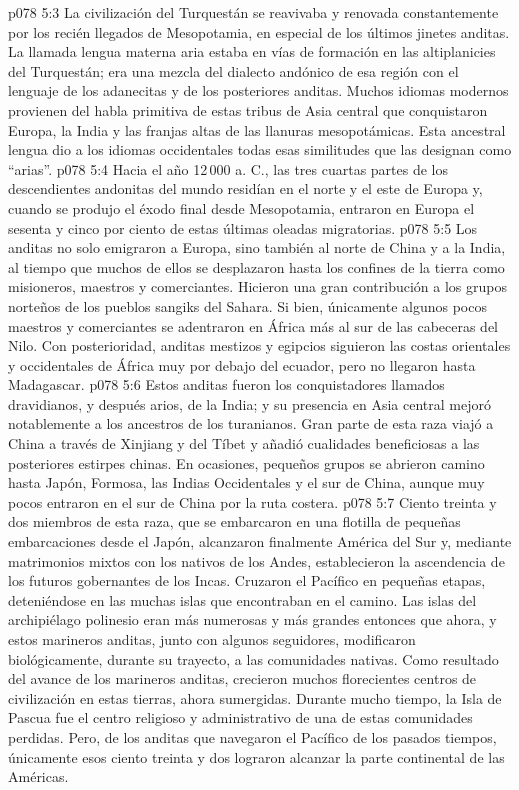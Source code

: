 \vs p078 5:3 La civilización del Turquestán se reavivaba y renovada constantemente por los recién llegados de Mesopotamia, en especial de los últimos jinetes anditas. La llamada lengua materna aria estaba en vías de formación en las altiplanicies del Turquestán; era una mezcla del dialecto andónico de esa región con el lenguaje de los adanecitas y de los posteriores anditas. Muchos idiomas modernos provienen del habla primitiva de estas tribus de Asia central que conquistaron Europa, la India y las franjas altas de las llanuras mesopotámicas. Esta ancestral lengua dio a los idiomas occidentales todas esas similitudes que las designan como “arias”.
\vs p078 5:4 \pc Hacia el año 12\,000 a. C., las tres cuartas partes de los descendientes andonitas del mundo residían en el norte y el este de Europa y, cuando se produjo el éxodo final desde Mesopotamia, entraron en Europa el sesenta y cinco por ciento de estas últimas oleadas migratorias.
\vs p078 5:5 \pc Los anditas no solo emigraron a Europa, sino también al norte de China y a la India, al tiempo que muchos de ellos se desplazaron hasta los confines de la tierra como misioneros, maestros y comerciantes. Hicieron una gran contribución a los grupos norteños de los pueblos sangiks del Sahara. Si bien, únicamente algunos pocos maestros y comerciantes se adentraron en África más al sur de las cabeceras del Nilo. Con posterioridad, anditas mestizos y egipcios siguieron las costas orientales y occidentales de África muy por debajo del ecuador, pero no llegaron hasta Madagascar.
\vs p078 5:6 Estos anditas fueron los conquistadores llamados dravidianos, y después arios, de la India; y su presencia en Asia central mejoró notablemente a los ancestros de los turanianos. Gran parte de esta raza viajó a China a través de Xinjiang y del Tíbet y añadió cualidades beneficiosas a las posteriores estirpes chinas. En ocasiones, pequeños grupos se abrieron camino hasta Japón, Formosa, las Indias Occidentales y el sur de China, aunque muy pocos entraron en el sur de China por la ruta costera.
\vs p078 5:7 Ciento treinta y dos miembros de esta raza, que se embarcaron en una flotilla de pequeñas embarcaciones desde el Japón, alcanzaron finalmente América del Sur y, mediante matrimonios mixtos con los nativos de los Andes, establecieron la ascendencia de los futuros gobernantes de los Incas. Cruzaron el Pacífico en pequeñas etapas, deteniéndose en las muchas islas que encontraban en el camino. Las islas del archipiélago polinesio eran más numerosas y más grandes entonces que ahora, y estos marineros anditas, junto con algunos seguidores, modificaron biológicamente, durante su trayecto, a las comunidades nativas. Como resultado del avance de los marineros anditas, crecieron muchos florecientes centros de civilización en estas tierras, ahora sumergidas. Durante mucho tiempo, la Isla de Pascua fue el centro religioso y administrativo de una de estas comunidades perdidas. Pero, de los anditas que navegaron el Pacífico de los pasados tiempos, únicamente esos ciento treinta y dos lograron alcanzar la parte continental de las Américas.
